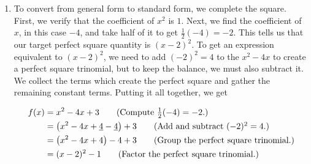 {
\begin{enumerate}

\item   To convert from general form to standard form, we complete the square. First, we verify that the coefficient of $x^2$ is $1$.  Next, we find the coefficient of $x$, in this case $-4$, and take half of it to get $\frac{1}{2}(-4) = -2$.  This tells us that our target perfect square quantity is $(x-2)^2$.  To get an expression equivalent to $(x-2)^2$, we need to add $(-2)^2 = 4$ to the $x^2-4x$ to create a perfect square trinomial, but to keep the balance, we must also subtract it.  We collect the terms which create the perfect square and gather the remaining constant terms. Putting it all together, we get 


\begin{align*}
f(x) & =  x^2-4x+3  \tag*{(Compute $\frac{1}{2} (-4) = -2$.)} \\
     & =  \left(x^2 - 4x + \underline{4}  - \underline{4}\right) + 3  \tag*{(Add and subtract $(-2)^2 = 4$.)}\\
          & =  \left(x^2 - 4x + 4\right)  - 4 + 3  \tag*{(Group the perfect square trinomial.)}\\
     & =  (x-2)^2 - 1  \tag*{(Factor the perfect square trinomial.)}
\end{align*}

\smallskip




\end{enumerate}}
